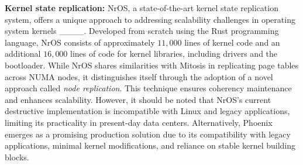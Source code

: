 \textbf{Kernel state replication:} NrOS, a state-of-the-art kernel state replication system, offers a unique approach to addressing scalability challenges in operating system kernels ____. Developed from scratch using the Rust programming language, NrOS consists of approximately $11,000$ lines of kernel code and an additional $16,000$ lines of code for kernel libraries, including drivers and the bootloader. While NrOS shares similarities with Mitosis in replicating page tables across NUMA nodes, it distinguishes itself through the adoption of a novel approach called \emph{node replication}. This technique ensures coherency maintenance and enhances scalability. However, it should be noted that NrOS's current destructive implementation is incompatible with Linux and legacy applications, limiting its practicality in present-day data centers. Alternatively, Phoenix emerges as a promising production solution due to its compatibility with legacy applications, minimal kernel modifications, and reliance on stable kernel building blocks.